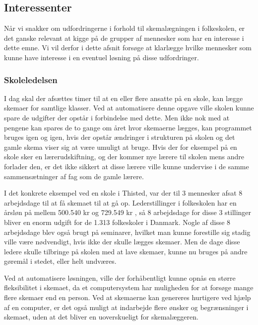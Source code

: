 \subsection{Interessenter}
Når vi snakker om udfordringerne i forhold til skemalægningen i folkeskolen, er det ganske relevant at kigge på de grupper af mennesker som har en interesse i dette emne. Vi vil derfor i dette afsnit forsøge at klarlægge hvilke mennesker som kunne have interesse i en eventuel løsning på disse udfordringer.

\subsubsection{Skoleledelsen}

I dag skal der afsættes timer til at en eller flere ansatte på en skole, kan lægge skemaer for samtlige klasser. Ved at automatisere denne opgave ville skolen kunne spare de udgifter der opstår i forbindelse med dette. Men ikke nok med at pengene kan spares de to gange om året hvor skemaerne lægges, kan programmet bruges igen og igen, hvis der opstår ændringer i strukturen på skolen og det gamle skema viser sig at være umuligt at bruge. Hvis der for eksempel på en skole sker en lærerudskiftning, og der kommer nye lærere til skolen mens andre forlader den, er det ikke sikkert at disse lærere ville kunne undervise i de samme sammensætninger af fag som de gamle lærere.

I det konkrete eksempel ved en skole i Thisted, var der til 3 mennesker afsat 8 arbejdsdage til at få skemaet til at gå op. Lederstillinger i folkeskolen har en årsløn på mellem 500.540 kr og 729.549 kr \cite{TR_HAANDBOGEN}\cite{Statens_adm}, så 8 arbejdsdage for disse 3 stillinger bliver en enorm udgift for de 1.313 folkeskoler i Danmark\cite{UVM-Folkeskoler}. Nogle af disse 8 arbejdsdage blev også brugt på seminarer, hvilket man kunne forestille sig stadig ville være nødvendigt, hvis ikke der skulle lægges skemaer. Men de dage disse ledere skulle tilbringe på skolen med at lave skemaer, kunne nu bruges på andre gøremål i stedet, eller helt undværes.

Ved at automatisere løsningen, ville der forhåbentligt kunne opnås en større fleksibilitet i skemaet, da et computersystem har muligheden for at forsøge mange flere skemaer end en person. Ved at skemaerne kan genereres hurtigere ved hjælp af en computer, er det også muligt at indarbejde flere ønsker og begrænsninger i skemaet, uden at det bliver en uoverskueligt for skemalæggeren. 

